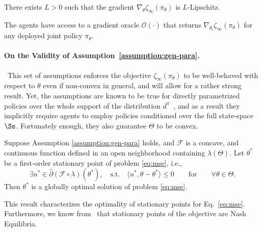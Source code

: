 \begin{assumption}
	\label{assumption:ncvx-Lip}
	There exists $ L>0$ such that the gradient $\nabla_{\theta }\zeta_\infty(\pi_{\theta})$ is $L$-Lipschitz. 
\end{assumption}

\begin{assumption}
	\label{assumption:gradient}
	The agents have access to a gradient oracle $\mathcal O(\cdot)$ that returns $\nabla_{\theta_i}\zeta_\infty(\pi_\theta)$ for any deployed joint policy $\pi_\theta$.
\end{assumption}

\paragraph*{On the Validity of Assumption~\ref{assumption:gen-para}.}~This set of assumptions enforces the objective $\zeta_\infty(\pi_\theta)$ to be well-behaved with respect to $\theta$ even if non-convex in general, and will allow for a rather strong result. Yet, the assumptions are known to be true for directly parametrized policies over the whole support of the distribution $d^\pi$~\citep{zhang2020variationalpolicygradientmethod}, and as a result they implicitly require agents to employ policies conditioned over the full state-space $\Ss$. Fortunately enough, they also guarantee $\Theta$ to be convex. 


\begin{lemma}
	\label{lemma:global-opt}
	Suppose Assumption \ref{assumption:gen-para} holds, and $\mathcal F$ is a concave, and continuous function defined in an open neighborhood containing $\lambda(\Theta)$. 
	Let $\theta^*$ be a first-order stationary point of problem \eqref{eq:mse}, i.e.,\vspace{-2mm}
	\begin{equation}
	\label{defn:1st-order-condition}
	\exists u^*\in\hat{\partial}(\mathcal F\circ\lambda)(\theta^*),\quad\text{s.t.}\quad \langle u^*, \theta-\theta^*\rangle\leq0 \qquad\mbox{for}\qquad\forall \theta\in\Theta.
	\end{equation}
	Then $\theta^*$ is a globally optimal solution of problem \eqref{eq:mse}.
\end{lemma}
This result characterizes the optimality of stationary points for Eq.~\eqref{eq:mse}. Furthermore, we know from~\citet{leonardos2021globalconvergencemultiagentpolicy} that stationary points of the objective are Nash Equilibria.


